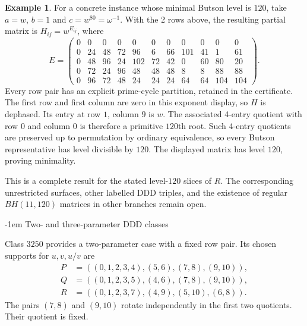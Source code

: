 \documentclass[11pt,a4paper]{article}
\makeatletter
\theoremstyle{plain}
\theoremstyle{definition}
\newtheorem{example}[theorem]{Example}
\theoremstyle{plain}
\renewcommand\subsection{\@startsection{subsection}{2}{\z@}  {\medskipamount}  {-1em}  {\normalfont\normalsize\bfseries}}
\makeatother
\begin{document}
\par\addvspace{\medskipamount}\noindent
\begin{minipage}{\linewidth}
\begin{example}
For a concrete instance whose minimal Butson level is $120$, take $a=w$, $b=1$ and $c=w^{80}=\omega^{-1}$. With the 2 rows above, the resulting partial matrix is $H_{ij}=w^{E_{ij}}$, where
\[
E=\begin{pmatrix}
0&0&0&0&0&0&0&0&0&0&0\\
0&24&48&72&96&6&66&101&41&1&61\\
0&48&96&24&102&72&42&0&60&80&20\\
0&72&24&96&48&48&48&8&8&88&88\\
0&96&72&48&24&24&24&64&64&104&104
\end{pmatrix}.
\]
Every row pair has an explicit prime-cycle partition, retained in the certificate. The first row and first column are zero in this exponent display, so $H$ is dephased. Its entry at row $1$, column $9$ is $w$. The associated 4-entry quotient with row $0$ and column $0$ is therefore a primitive $120$th root. Such 4-entry quotients are preserved up to permutation by ordinary equivalence, so every Butson representative has level divisible by $120$. The displayed matrix has level $120$, proving minimality.
\end{example}
\end{minipage}
\par\addvspace{\medskipamount}

\medskip

This is a complete result for the stated level-$120$ slices of $R$. The corresponding unrestricted surfaces, other labelled $\mathrm{DDD}$ triples, and the existence of regular $BH(11,120)$ matrices in other branches remain open.

\subsection{Two- and three-parameter DDD classes}\label{sec:ddd_pilots}

Class $3250$ provides a two-parameter case with a fixed row pair. Its chosen supports for $u,v,u/v$ are
$$\begin{aligned}
P&=((0,1,2,3,4),(5,6),(7,8),(9,10)),\\
Q&=((0,1,2,3,5),(4,6),(7,8),(9,10)),\\
R&=((0,1,2,3,7),(4,9),(5,10),(6,8)).
\end{aligned}$$
The pairs $(7,8)$ and $(9,10)$ rotate independently in the first two quotients. Their quotient is fixed.
\end{document}
